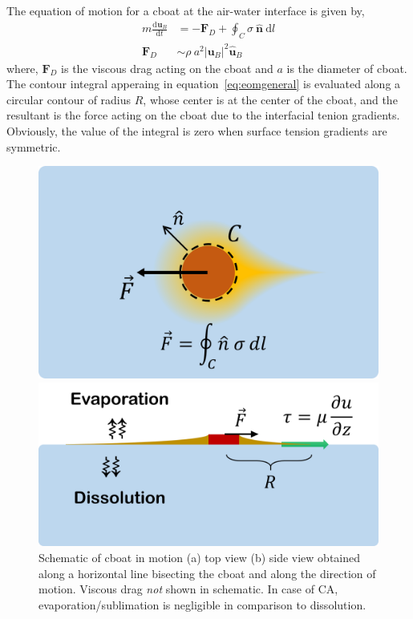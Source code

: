 \documentclass[journal=langd5, manuscript=article, layout=twocolumn]{achemso}
\newcommand{\tdc}[3][]{\frac{\mathrm{d}^{#1}#2}{\mathrm{d}#3^{#1}}} %
\newcommand{\td}[1]{\mathrm{d}#1}
\begin{document}
The equation of motion for a cboat at the air-water interface is given by,
\begin{equation}\label{eq:eomgeneral}
\begin{aligned}
m \tdc{\mathbf{u}_{B}}{t} &= -\mathbf{F}_{D} + \oint_{C} \sigma \ \hat{\mathbf{n}} \ \td{l} \\
\mathbf{F}_{D} &\sim \rho\ a^{2} \left|\mathbf{u}_{B}\right|^{2} \hat{\mathbf{u}}_{B}
\end{aligned}
\end{equation}
where, $\mathbf{F}_{D}$ is the viscous drag acting on the cboat and $a$ is the diameter of cboat. The contour integral apperaing in equation~\ref{eq:eomgeneral} is evaluated along a circular contour of radius $R$, whose center is at the center of the cboat, and the resultant is the force acting on the cboat due to the interfacial tenion gradients. Obviously, the value of the integral is zero when surface tension gradients are symmetric. 
\begin{figure}[ht]
    \centering
	\begin{minipage}[c]{0.4\linewidth}
		\centering
		\includegraphics[width=\textwidth]{schematic_a_v1.png}
	\end{minipage}\hspace{0.5cm}
	\begin{minipage}[c]{0.4\linewidth}
		\centering
		\includegraphics[width=\textwidth]{schematic_b_v1.png}
	\end{minipage}
	\caption{Schematic of cboat in motion (a) top view (b) side view obtained along a horizontal line bisecting the cboat and along the direction of motion. Viscous drag \emph{not} shown in schematic. In case of CA, evaporation/sublimation is negligible in comparison to dissolution.}\label{fig:schematic}
\end{figure}
\end{document}
